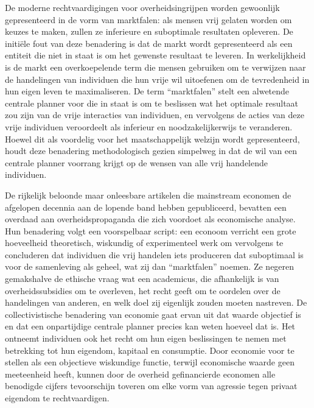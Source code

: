 De moderne rechtvaardigingen voor overheidsingrijpen worden gewoonlijk gepresenteerd in de vorm van marktfalen: als mensen vrij gelaten worden om keuzes te maken, zullen ze inferieure en suboptimale resultaten opleveren. De initiële fout van deze benadering is dat de markt wordt gepresenteerd als een entiteit die niet in staat is om het gewenste resultaat te leveren. In werkelijkheid is de markt een overkoepelende term die mensen gebruiken om te verwijzen naar de handelingen van individuen die hun vrije wil uitoefenen om de tevredenheid in hun eigen leven te maximaliseren. De term ``marktfalen'' stelt een alwetende centrale planner voor die in staat is om te beslissen wat het optimale resultaat zou zijn van de vrije interacties van individuen, en vervolgens de acties van deze vrije individuen veroordeelt als inferieur en noodzakelijkerwijs te veranderen. Hoewel dit als voordelig voor het maatschappelijk welzijn wordt gepresenteerd, houdt deze benadering methodologisch gezien simpelweg in dat de wil van een centrale planner voorrang krijgt op de wensen van alle vrij handelende individuen.

De rijkelijk beloonde maar onleesbare artikelen die mainstream economen de afgelopen decennia aan de lopende band hebben gepubliceerd, bevatten een overdaad aan overheidspropaganda die zich voordoet als economische analyse. Hun benadering volgt een voorspelbaar script: een econoom verricht een grote hoeveelheid theoretisch, wiskundig of experimenteel werk om vervolgens te concluderen dat individuen die vrij handelen iets produceren dat suboptimaal is voor de samenleving als geheel, wat zij dan ``marktfalen'' noemen. Ze negeren gemakshalve de ethische vraag wat een academicus, die afhankelijk is van overheidssubsidies om te overleven, het recht geeft om te oordelen over de handelingen van anderen, en welk doel zij eigenlijk zouden moeten nastreven. De collectivistische benadering van economie gaat ervan uit dat waarde objectief is en dat een onpartijdige centrale planner precies kan weten hoeveel dat is. Het ontneemt individuen ook het recht om hun eigen beslissingen te nemen met betrekking tot hun eigendom, kapitaal en consumptie. Door economie voor te stellen als een objectieve wiskundige functie, terwijl economische waarde geen meeteenheid heeft, kunnen door de overheid gefinancierde economen alle benodigde cijfers tevoorschijn toveren om elke vorm van agressie tegen privaat eigendom te rechtvaardigen.

